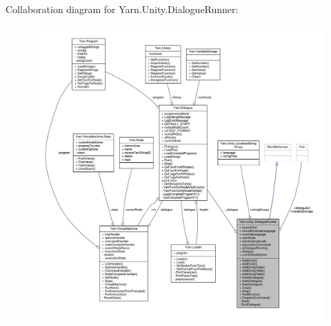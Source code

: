 Collaboration diagram for Yarn.\-Unity.\-Dialogue\-Runner\-:
\nopagebreak
\begin{figure}[H]
\begin{center}
\leavevmode
\includegraphics[width=350pt]{a00781}
\end{center}
\end{figure}
